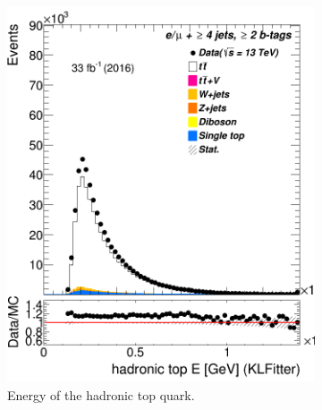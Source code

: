 \begin{figure}
\begin{subfigure}{0.25\textwidth}
	\includegraphics[width=\linewidth]{ControlPlots_emujets_2016_4incl_2incl/klf_topHad_E_emujets_2016.png}
	\caption{Energy of the hadronic top quark.} \label{fig:K7}
\end{subfigure}
\hspace*{0.5cm}
\begin{subfigure}{0.25\textwidth}

\end{subfigure}
\end{figure}
